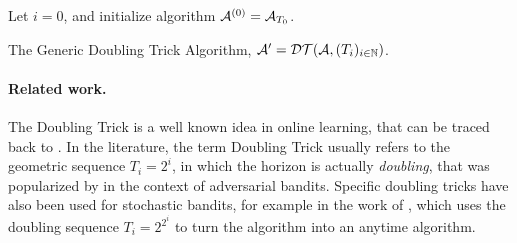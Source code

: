 \documentclass[12pt]{colt2018} %
\begin{document}
\vspace*{5pt}  %
\begin{algorithm}[H]
        \LinesNumbered  %
        \DontPrintSemicolon
        \BlankLine
        Let $i = 0$, and initialize algorithm $\mathcal{A}^{(0)} = \mathcal{A}_{T_0}$.\;
        \caption{The Generic Doubling Trick Algorithm, $\mathcal{A}' = \mathcal{DT}(\mathcal{A}, (T_i)_{i\in\mathbb{N}})$.}
\label{algo:DTr}
\end{algorithm}
\vspace*{5pt}  %

%


\paragraph{Related work.}
The Doubling Trick is a well known idea in online learning, that can be traced back to \cite{auer1995gambling}.
In the literature, the term Doubling Trick usually refers to the geometric sequence $T_i = 2^i$, in which the horizon is actually \emph{doubling}, that was popularized by
\cite{CesaLugosi06} in the context of adversarial bandits. Specific doubling tricks have also been used for stochastic bandits, for example in the work of \cite{Auer10}, which uses
the doubling sequence $T_i = 2^{2^{i}}$ to turn the \UCBR{} algorithm into an anytime algorithm.
\end{document}
